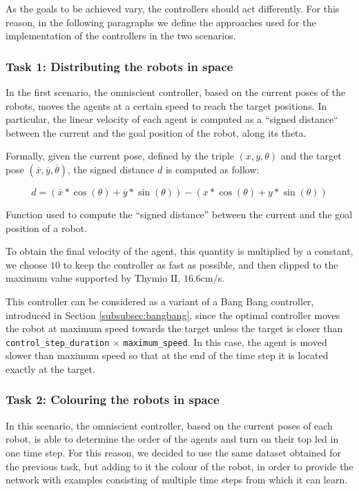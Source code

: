 As the goals to be achieved vary, the controllers should act differently. For this 
reason, in the following paragraphs we define the approaches used for the 
implementation of the controllers in the two scenarios.

\subsubsection{Task 1: Distributing the robots in space}
\label{subsubsec:experttask1}

In the first scenario, the omniscient controller, based on the current poses of the 
robots, moves the agents at a certain speed to reach the target positions. In 
particular, the linear velocity of each agent is computed as a ``signed distance`` 
between the current and the goal position of the robot, along its theta. 

Formally, given the current pose, defined by the triple $(x, y, \theta)$ and the 
target pose $(\overline x, \overline y, \overline \theta)$, the signed distance $d$ 
is computed as follow:
\begin{Equation}[!htb]
	\centering
	\begin{equation}
	d = \left(\overline x * \cos (\theta) + \overline y * \sin (\theta)\right) -
	\left( x * \cos (\theta) + y * \sin (\theta)\right)
	\end{equation}
	\caption[Signed distance function.]{Function used to compute the ``signed 
		distance'' between the current and the goal position of a robot.}
	\label{eq:signeddist}
\end{Equation}

\noindent
To obtain the final velocity of the agent, this quantity is multiplied by a constant, 
we choose $10$ to keep the controller as fast as possible, and then clipped to the 
maximum value supported by Thymio II, $16.6$cm/s.

This controller can be considered as a variant of a Bang Bang controller, 
introduced in Section \ref{subsubsec:bangbang}, since the optimal controller 
moves the robot at maximum speed towards the target unless the target is closer 
than \texttt{control\_step\_duration} $\times$ \texttt{maximum\_speed}. In this 
case, the agent is moved slower than maximum speed so that at the end of the 
time step it is located exactly at the target.

\subsubsection{Task 2: Colouring the robots in space}
In this scenario, the omniscient controller, based on the current poses of each 
robot, is able to determine the order of the agents and turn on their top \gls{led}  
in one time step. For this reason, we decided to use the same dataset obtained for 
the previous task, but adding to it the colour of the robot, in order to provide the 
network with examples consisting of multiple time steps from which it can learn.



